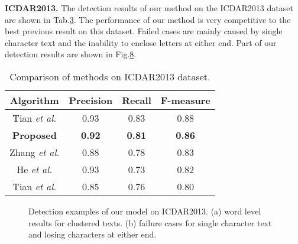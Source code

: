 \documentclass[10pt,twocolumn,letterpaper]{article}
\begin{document}
	
	
	
	\noindent \textbf{ICDAR2013.} The detection results of our method on the ICDAR2013 dataset are shown in Tab.\hyperref[Tab.3]{3}.
	The performance of our method is very competitive to the best previous result on this dataset.
	Failed cases are mainly caused by single character text and the inability to enclose letters at either end. Part of our detection results are shown in Fig.\hyperref[Fig.8]{8}.
	
	\begin{table}
		\label{Tab.3}
		\small
		\renewcommand\arraystretch{1.2}
		\centering
		\caption{Comparison of methods on ICDAR2013 dataset.}
		\begin{tabular}{|c|c|c|c|}
			\hline
			Algorithm & Precision & Recall & F-measure \\
			\hline
			\hline
			{Tian} \emph{et al.} \cite{ctpn} & {0.93} & {0.83} & {0.88} \\
			\hline
			\textbf{Proposed} & \textbf{0.92} & \textbf{0.81} & \textbf{0.86} \\
			\hline
			Zhang \emph{et al.} \cite{fcn-text} & 0.88 & 0.78 & 0.83 \\
			\hline
			He \emph{et al.} \cite{he2016text} & 0.93 & 0.73 & 0.82 \\
			\hline
			Tian \emph{et al.} \cite{textflow} & 0.85 & 0.76 & 0.80 \\
			\hline
		\end{tabular}
	\end{table}
	
	\begin{figure}
		\label{Fig.8}
		\centering

		\caption{Detection examples of our model on ICDAR2013. (a) word level results for clustered texts. (b) failure cases for single character text and losing characters at either end.}
	\end{figure}
	
\end{document}

